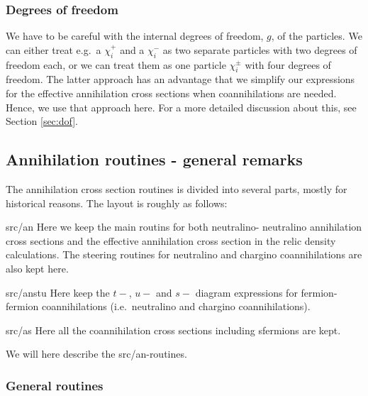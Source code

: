 \documentclass[a4paper,10pt,oneside]{book}
\newcommand{\code}[1]{\ft{#1}}
\newcommand{\ft}[1]{\textsf{#1}}
\begin{document}
\subsubsection{Degrees of freedom}

We have to be careful with the internal degrees of freedom, $g$, of
the particles. We can either treat e.g.\ a $\chi_i^+$ and a $\chi_i^-$ as
two separate particles with two degrees of freedom each, or we can
treat them as one particle $\chi_i^\pm$ with four degrees of
freedom. The latter approach has an advantage that we
simplify our expressions for the effective annihilation
cross sections when coannihilations are needed. Hence, we use that
approach here. For a more detailed discussion about this, see Section
\ref{sec:dof}. 

\subsection{Annihilation routines - general remarks}

The annihilation cross section routines is divided into several parts,
mostly for historical reasons. The layout is roughly as follows:
\begin{description}
  \item{\code{src/an}} Here we keep the main routins for both neutralino-
  neutralino annihilation cross sections and the effective annihilation
  cross section in the relic density calculations. The steering routines
  for neutralino and chargino coannihilations are also kept here.
  
\item{\code{src/anstu}} Here keep the $t-$, $u-$ and $s-$ diagram expressions
for fermion-fermion coannihilations (i.e.\ neutralino and chargino
coannihilations).

\item{\code{src/as}} Here all the coannihilation cross sections including
sfermions are kept.

\end{description}

We will here describe the \code{src/an}-routines.


\subsubsection{General routines}
\end{document}
